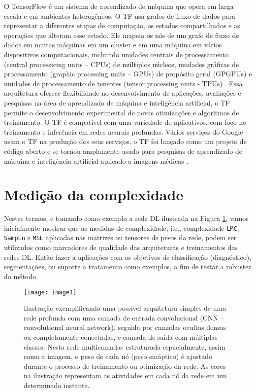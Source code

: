 \documentclass[
	12pt,				%
	openany,oneside,
	a4paper,			%
	english,			%
	brazil,				%
	]{abntex2}
\begin{document}
O TensorFlow é um sistema de aprendizado de máquina que opera em larga escala e em ambientes heterogêneos. O TF usa grafos de fluxo de dados para representar a diferentes etapas de computação, os estados compartilhados e as operações que alteram esse estado. Ele mapeia os nós de um grafo de fluxo de dados em muitas máquinas em um cluster e em uma máquina em vários dispositivos computacionais, incluindo unidades centrais de processamento (central processicing units – CPUs) de múltiplos núcleos, unidades gráficas de processamento (graphic processing units – GPUs) de propósito geral (GPGPUs) e unidades  de processamento de tensores (tensor processing units - TPUs) \cite{c36}. Essa arquitetura oferece flexibilidade no desenvolvimento de aplicações, avaliações e pesquisas na área de aprendizado de máquina e inteligência artificial, o TF permite o desenvolvimento experimental de novas otimizações e algoritmos de treinamento. O TF é compatível com uma variedade de aplicativos, com foco no treinamento e inferência em redes neurais profundas. Vários serviços do Google usam o TF na produção dos seus serviços, o TF foi lançado como um projeto de código aberto e se tornou amplamente usado para pesquisas de aprendizado de máquina e inteligência artificial aplicado a imagens médicas \cite{c37, c38}.


\section{Medição da complexidade}
Nestes termos, e tomando como exemplo a rede DL ilustrada na Figura \ref{fig1}, vamos inicialmente mostrar que as medidas de complexidade, i.e., complexidade \texttt{LMC}, \texttt{SampEn} e \texttt{MSE} aplicadas nas matrizes ou tensores de pesos da rede, podem ser utilizados como marcadores de qualidade das arquiteturas e treinamentos das redes DL. Então fazer a aplicações com os objetivos de classificação (diagnóstico), segmentações, ou suporte a tratamento como exemplos, a fim de testar a robustez do método. 

\begin{figure}
\texttt{[image: image1]}
\caption{\label{fig1}Ilustração exemplificando uma possível arquitetura simples de uma rede profunda com uma camada de entrada convolucional (CNN – convolutional neural network), seguida por camadas ocultas densas ou completamente conectadas, e camada de saída com múltiplas classes. Nesta rede multicamadas estruturada espacialmente, assim como a imagem, o peso de cada nó (peso sináptico) é ajustado durante o processo de treinamento ou otimização da rede. As cores na ilustração representam as atividades em cada nó da rede em um determinado instante.}
\end{figure}
\end{document}

